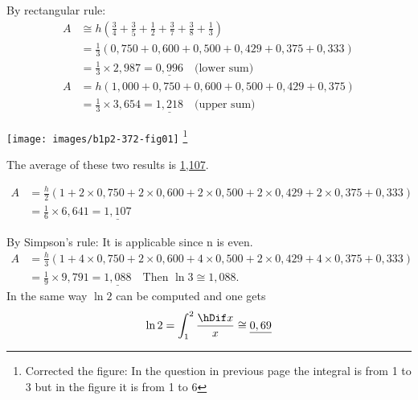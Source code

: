 \documentclass[11pt]{amsbook}
\begin{document}

\begin{exmp}
	\begin{hSolution}
		\begin{hEnumerateArabic}
			
			\item
			\begin{multicols}{2}
				By rectangular rule:
				\begin{align*}
					A & \cong h( \frac{3}{4} + \frac{3}{5} + \frac{1}{2} 
						+ \frac{3}{7} + \frac{3}{8} + \frac{1}{3}) \\
					& = \frac{1}{3} (0,750+0,600+0,500+0,429+0,375+0,333) \\
					& = \frac{1}{3} \times 2,987 = \underline{0,996} \quad \text{(lower sum)} \\
					A & = h(1,000+0,750+0,600+0,500+0,429+0,375) \\
					& = \frac{1}{3} \times 3,654 = \underline{1,218} \quad \text{(upper sum)}
				\end{align*}
			
				\texttt{[image: images/b1p2-372-fig01]}
				\footnote{Corrected the figure: In the question in previous page the integral is from 1 to 3 but in the figure it is from 1 to 6}
			\end{multicols}

			The average of these two results is \underline{1,107}.
			
			\item
			\begin{align*}
				A & = \frac{h}{2} (1+2 \times 0,750 + 2 \times 0,600 + 2 \times 0,500 + 2\times 0,429
					+ 2 \times 0,375 + 0,333) \\
				& = \frac{1}{6} \times 6,641 = \underline{1,107}
			\end{align*}
			
			\item
			By Simpson's rule: It is applicable since n is even.
			\begin{align*}
				A & = \frac{h}{3} (1 + 4 \times 0,750 + 2 \times 0,600 + 4 \times 0,500 + 2 \times 0,429
					+ 4 \times 0,375 + 0,333) \\
				& = \frac{1}{9} \times 9,791 = \underline{1,088} \quad \text{Then } \ln 3 \cong 1,088.
			\end{align*}
			In the same way $\ln 2$ can be computed and one gets
			\[
				\ln 2 = \int_{1}^{2} \frac{\hDif x}{x} \cong \underline{0,69}
			\]
		\end{hEnumerateArabic}
	\end{hSolution}
\end{exmp}
\end{document}
